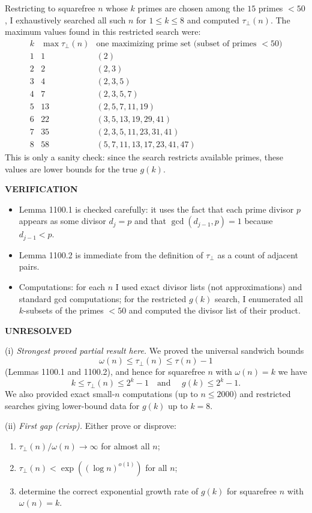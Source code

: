 \smallskip
\noindent
Restricting to squarefree $n$ whose $k$ primes are chosen among the $15$ primes $<50$, I exhaustively searched all such $n$ for $1\le k\le 8$ and computed $\tau_\perp(n)$. The maximum values found in this restricted search were:
\[
\begin{array}{r|r|l}
 k & \max \tau_\perp(n) & \text{one maximizing prime set (subset of primes $<50$)} \\\hline
 1&1&(2)\\
 2&2&(2,3)\\
 3&4&(2,3,5)\\
 4&7&(2,3,5,7)\\
 5&13&(2,5,7,11,19)\\
 6&22&(3,5,13,19,29,41)\\
 7&35&(2,3,5,11,23,31,41)\\
 8&58&(5,7,11,13,17,23,41,47)
\end{array}
\]
This is only a sanity check: since the search restricts available primes, these values are lower bounds for the true $g(k)$.

\medskip
\noindent\textbf{VERIFICATION}

\smallskip
\noindent
\begin{itemize}
\item Lemma 1100.1 is checked carefully: it uses the fact that each prime divisor $p$ appears as some divisor $d_j=p$ and that $\gcd(d_{j-1},p)=1$ because $d_{j-1}<p$.
\item Lemma 1100.2 is immediate from the definition of $\tau_\perp$ as a count of adjacent pairs.
\item Computations: for each $n$ I used exact divisor lists (not approximations) and standard gcd computations; for the restricted $g(k)$ search, I enumerated all $k$-subsets of the primes $<50$ and computed the divisor list of their product.
\end{itemize}

\medskip
\noindent\textbf{UNRESOLVED}

\smallskip
\noindent
(i) \emph{Strongest proved partial result here.}
We proved the universal sandwich bounds
\[
\omega(n)\le \tau_\perp(n)\le \tau(n)-1
\]
(Lemmas 1100.1 and 1100.2), and hence for squarefree $n$ with $\omega(n)=k$ we have
\[
 k\le \tau_\perp(n)\le 2^k-1\quad\text{and }\quad g(k)\le 2^k-1.
\]
We also provided exact small-$n$ computations (up to $n\le 2000$) and restricted searches giving lower-bound data for $g(k)$ up to $k=8$.

\smallskip
\noindent
(ii) \emph{First gap (crisp).}
Either prove or disprove:
\begin{enumerate}
\item $\tau_\perp(n)/\omega(n)\to\infty$ for almost all $n$;
\item $\tau_\perp(n)<\exp((\log n)^{o(1)})$ for all $n$;
\item determine the correct exponential growth rate of $g(k)$ for squarefree $n$ with $\omega(n)=k$.
\end{enumerate}

